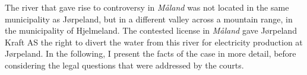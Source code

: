 The river that gave rise to controversy in {\it Måland} was not located in the same municipality as Jørpeland, but in a different valley across a mountain range, in the municipality of Hjelmeland. The contested license in {\it Måland} gave Jørpeland Kraft AS the right to divert the water from this river for electricity production at Jørpeland. In the following, I present the facts of the case in more detail, before considering the legal questions that were addressed by the courts.





